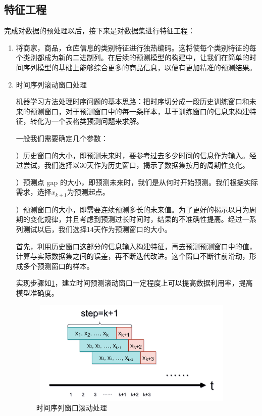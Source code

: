 \documentclass[withoutpreface,bwprint]{cumcmthesis}
\begin{document}
\subsection{特征工程}
     完成对数据的预处理以后，接下来是对数据集进行特征工程：
    \begin{enumerate}
    \item 将商家，商品，仓库信息的类别特征进行独热编码。这将使每个类别特征的每个类别都成为新的二进制列。在后续的预测模型的构建中，让我们在简单的时间序列模型的基础上能够综合更多的商品信息，以便有更加精准的预测结果。
    \item 时间序列滚动窗口处理
    
   \qquad 机器学习方法处理时序问题的基本思路：把时序切分成一段历史训练窗口和未来的预测窗口，对于预测窗口中的每一条样本，基于训练窗口的信息来构建特征，转化为一个表格类预测问题来求解。

   \qquad 一般我们需要确定几个参数：
    
    ）历史窗口的大小，即预测未来时，要参考过去多少时间的信息作为输入。经过尝试，我们选择以30天作为历史窗口，揭示了数据集按月的周期性变化。
    
    ）预测点 gap 的大小，即预测未来时，我们是从何时开始预测。我们根据实际需求，选择$x_{k+1}$为预测起点。
    
   ）预测窗口的大小，即需要连续预测多长的未来值。为了更好的揭示以月为周期的变化规律，并且考虑到预测过长时间时，结果的不准确性提高。经过一系列测试以后，我们选择14天作为预测窗口的大小。

    \qquad 首先，利用历史窗口这部分的信息输入构建特征，再去预测预测窗口中的值，计算与实际数据集之间的误差，再不断迭代改进。这个窗口不断往前滑动，形成多个预测窗口的样本。
    
    \qquad 实现步骤如\ref{时间窗口处理}，建立时间预测滚动窗口一定程度上可以提高数据利用率，提高模型准确度。
    \begin{figure}[htbp]
       \centering
       \includegraphics[width=10cm,height=5cm]{figure/时间窗口.png}%
       \caption{时间序列窗口滚动处理}
       \label{时间窗口处理}
    \end{figure}
    \end{enumerate}
\end{document}
